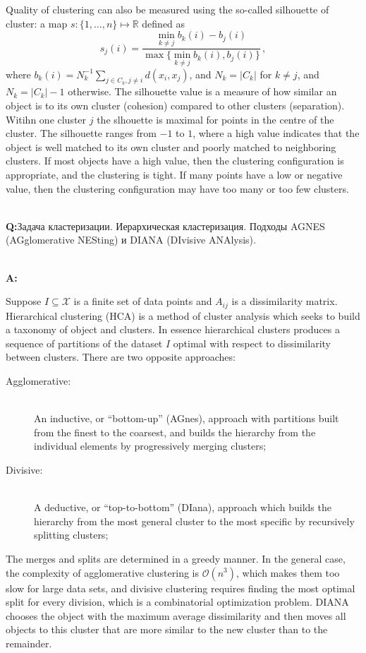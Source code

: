 \documentclass[a4paper]{article}
\newcommand{\Xcal}{\mathcal{X}}
\newcommand{\Real}{\mathbb{R}}
\newcommand{\rus}[1]{\foreignlanguage{russian}{#1}}
\begin{document}
Quality of clustering can also be measured using the so-called silhouette of cluster:
a map $s: \{1,\ldots, n\} \mapsto \Real$ defined as 
$$ s_j(i)
    = \frac{\min_{k\neq j} b_k(i) - b_j(i)}{\max\{\min_{k\neq j} b_k(i), b_j(i)\}}
    \,, $$
where $b_k(i) = N_k^{-1} \sum_{j\in C_k, j\neq i} d(x_i, x_j)$, and $N_k = |C_k|$ for
$k\neq j$, and $N_k = |C_k| - 1$ otherwise. The silhouette value is a measure of
how similar an object is to its own cluster (cohesion) compared to other clusters
(separation). Witihn one cluster $j$ the slhouette is maximal for points in the
centre of the cluster. The silhouette ranges from $-1$ to $1$, where a high value
indicates that the object is well matched to its own cluster and poorly matched
to neighboring clusters. If most objects have a high value, then the clustering
configuration is appropriate, and the clustering is tight. If many points have a
low or negative value, then the clustering configuration may have too many or too
few clusters.


\hfill\\\textbf{Q:}\rus{Задача кластеризации. Иерархическая кластеризация. Подходы
AGNES (AGglomerative NESting) и DIANA (DIvisive ANAlysis).}

\hfill\\\textbf{A:}

Suppose $I\subseteq \Xcal$ is a finite set of data points and $A_{ij}$ is a dissimilarity
matrix. Hierarchical clustering (HCA) is a method of cluster analysis which seeks
to build a taxonomy of object and clusters. In essence hierarchical clusters produces
a sequence of partitions of the dataset $I$ optimal with respect to dissimilarity
between clusters. There are two opposite approaches:\begin{description}
    \item[Agglomerative:] \hfill \\
        An inductive, or ``bottom-up'' (AGnes), approach with partitions built from
        the finest to the coarsest, and builds the hierarchy from the individual
        elements by progressively merging clusters;
    \item[Divisive:] \hfill \\
        A deductive, or ``top-to-bottom'' (DIana), approach which builds the hierarchy
        from the most general cluster to the most specific by recursively splitting
        clusters;
\end{description}
The merges and splits are determined in a greedy manner. In the general case, the
complexity of agglomerative clustering is $\mathcal{O}(n^3)$, which makes them too
slow for large data sets, and divisive clustering requires finding the most optimal
split for every division, which is a combinatorial optimization problem. DIANA chooses
the object with the maximum average dissimilarity and then moves all objects to this
cluster that are more similar to the new cluster than to the remainder. 
\end{document}
